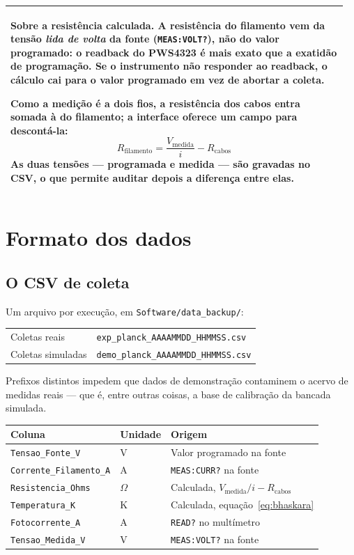 \documentclass[11pt,a4paper]{article}
\newenvironment{nota}
  {\par\medskip\noindent\begin{tabular}{|p{0.96\linewidth}|}\hline\rule{0pt}{3ex}}
  {\\[1ex]\hline\end{tabular}\par\medskip}
\begin{document}
\begin{nota}
\textbf{Sobre a resistência calculada.} A resistência do filamento vem da
tensão \emph{lida de volta} da fonte (\texttt{MEAS:VOLT?}), não do valor
programado: o readback do PWS4323 é mais exato que a exatidão de programação.
Se o instrumento não responder ao readback, o cálculo cai para o valor
programado em vez de abortar a coleta.

Como a medição é a dois fios, a resistência dos cabos entra somada à do
filamento; a interface oferece um campo para descontá-la:
\[
R_{\text{filamento}} = \frac{V_{\text{medida}}}{i} - R_{\text{cabos}}
\]
As duas tensões --- programada e medida --- são gravadas no CSV, o que permite
auditar depois a diferença entre elas.
\end{nota}

\section{Formato dos dados}

\subsection{O CSV de coleta}

Um arquivo por execução, em \texttt{Software/data\_backup/}:

\begin{center}
\begin{tabular}{@{}ll@{}}
\toprule
Coletas reais & \texttt{exp\_planck\_AAAAMMDD\_HHMMSS.csv} \\
Coletas simuladas & \texttt{demo\_planck\_AAAAMMDD\_HHMMSS.csv} \\
\bottomrule
\end{tabular}
\end{center}

Prefixos distintos impedem que dados de demonstração contaminem o acervo de
medidas reais --- que é, entre outras coisas, a base de calibração da bancada
simulada.

\begin{center}
\begin{tabular}{@{}lll@{}}
\toprule
\textbf{Coluna} & \textbf{Unidade} & \textbf{Origem} \\
\midrule
\texttt{Tensao\_Fonte\_V} & V & Valor programado na fonte \\
\texttt{Corrente\_Filamento\_A} & A & \texttt{MEAS:CURR?} na fonte \\
\texttt{Resistencia\_Ohms} & $\Omega$ & Calculada, $V_{\text{medida}}/i - R_{\text{cabos}}$ \\
\texttt{Temperatura\_K} & K & Calculada, equação~\eqref{eq:bhaskara} \\
\texttt{Fotocorrente\_A} & A & \texttt{READ?} no multímetro \\
\texttt{Tensao\_Medida\_V} & V & \texttt{MEAS:VOLT?} na fonte \\
\bottomrule
\end{tabular}
\end{center}
\end{document}
